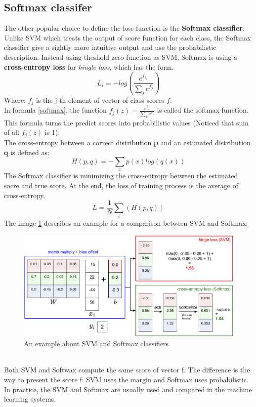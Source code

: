 \subsection{Softmax classifer}
The other popular choice to define the loss function  is the \textbf{Softmax classifier}. Unlike SVM which treats the output of score function for each class, the Softmax classifier give a sightly more intuitive output and use the probabilistic description. Instead using theshold zero function as SVM, Softmax is using a \textbf{cross-entropy loss} for \textit{hingle loss}, which has the form.
\begin{equation}
	L_i = -log(\frac{e^{f_{y_i}}}{\sum_j{e^{f_j}}})
	\label{softmax}
\end{equation}
Where: $f_j$ is the j-th element of vector of class scores \textbf{$f$}.\\[0.2cm]
In formula \ref{softmax}, the function $f_j(z) = \frac{e^{z_j}}{\sum_k{e^{z_k}}}$ is called the softmax function. This formula turns the predict scores into probabilistic values (Noticed that sum of all \textbf{$f_j(z) $} is 1).\\[0.2cm]
The cross-entropy between a correct distribution \textbf{p} and an estimated distribution \textbf{q} is defined as:
\begin{equation}
	H(p,q) = -\sum_x{p(x)log(q(x))}
\end{equation}
The Softmax classifier is minimizing the cross-entropy between the estimated socre and true score. At the end, the loss of training process is the average of cross-entropy.
\begin{equation}
	L = \frac{1}{N}\sum_i(H(p,q))
\end{equation}
The image \ref{figsvmsf} describes an example for a comparison between SVM and Softmax:
\begin{figure}[h]
	\centering
	\includegraphics[scale=0.45]{images/svmsf}
	\caption{An example about SVM and Softmax classifiers}
	\label{figsvmsf}
\end{figure}~\\[2.5cm]
Both SVM and Softwax compute the same score of vector f. The difference is the way to present the score f: SVM uses the margin and Softmax uses probabilistic. In practice, the SVM and Softmax are usually used and compared in the machine learning systems.
